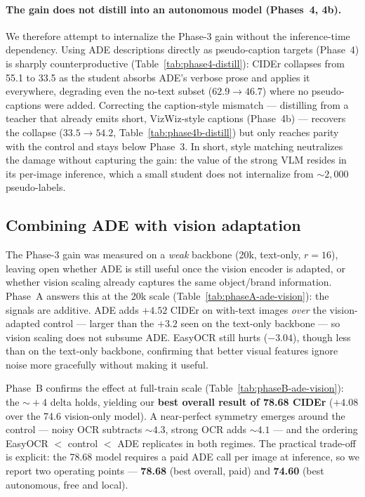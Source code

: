 \paragraph{The gain does not distill into an autonomous model (Phases~4, 4b).}
We therefore attempt to internalize the Phase-3 gain without the inference-time
dependency. Using ADE descriptions directly as pseudo-caption targets
(Phase~4) is sharply counterproductive (Table~\ref{tab:phase4-distill}): CIDEr
collapses from 55.1 to 33.5 as the student absorbs ADE's verbose prose and
applies it everywhere, degrading even the no-text subset
($62.9\!\to\!46.7$) where no pseudo-captions were added. Correcting the
caption-style mismatch --- distilling from a teacher that already emits short,
VizWiz-style captions (Phase~4b) --- recovers the collapse
($33.5\!\to\!54.2$, Table~\ref{tab:phase4b-distill}) but only reaches parity with
the control and stays below Phase~3. In short, style matching neutralizes the
damage without capturing the gain: the value of the strong VLM resides in its
per-image inference, which a small student does not internalize from
$\sim\!2{,}000$ pseudo-labels.

\subsection{Combining ADE with vision adaptation}
\label{sec:res-ade-vision}

The Phase-3 gain was measured on a \emph{weak} backbone (20k, text-only,
$r{=}16$), leaving open whether ADE is still useful once the vision encoder is
adapted, or whether vision scaling already captures the same object/brand
information. Phase~A answers this at the 20k scale
(Table~\ref{tab:phaseA-ade-vision}): the signals are additive. ADE adds $+4.52$
CIDEr on with-text images \emph{over} the vision-adapted control --- larger than
the $+3.2$ seen on the text-only backbone --- so vision scaling does not subsume
ADE. EasyOCR still hurts ($-3.04$), though less than on the text-only backbone,
confirming that better visual features ignore noise more gracefully without
making it useful.

Phase~B confirms the effect at full-train scale
(Table~\ref{tab:phaseB-ade-vision}): the $\sim\!+4$ delta holds, yielding our
\textbf{best overall result of 78.68 CIDEr} ($+4.08$ over the 74.6 vision-only
model). A near-perfect symmetry emerges around the control --- noisy OCR
subtracts ${\sim}4.3$, strong OCR adds ${\sim}4.1$ --- and the ordering
EasyOCR $<$ control $<$ ADE replicates in both regimes. The practical trade-off
is explicit: the 78.68 model requires a paid ADE call per image at inference,
so we report two operating points --- \textbf{78.68} (best overall, paid) and
\textbf{74.60} (best autonomous, free and local).

